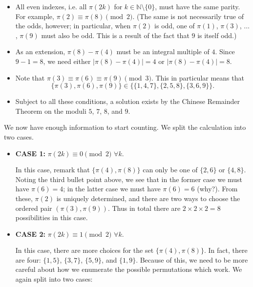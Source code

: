 \documentclass[10pt]{article}
\begin{document}
\begin{enumerate}
\begin{itemize}

\item All even indexes, i.e. all $\pi(2k)$ for $k\in\mathbb{N}\setminus\{0\}$, must have the same parity.  For example, $\pi(2)\equiv\pi(8)\pmod 2$.  (The same is not necessarily true of the odds, however; in particular, when $\pi(2)$ is odd, one of $\pi(1)$, $\pi(3)$, $\ldots$, $\pi(9)$ must also be odd.  This is a result of the fact that $9$ is itself odd.)

\item As an extension, $\pi(8)-\pi(4)$ must be an integral multiple of $4$.  Since $9-1=8$, we need either $|\pi(8)-\pi(4)|=4$ or $|\pi(8)-\pi(4)|=8.$

\item Note that $\pi(3)\equiv\pi(6)\equiv\pi(9)\pmod 3$.  This in particular means that \[\{\pi(3),\pi(6),\pi(9)\}\in\{\{1,4,7\},\{2,5,8\},\{3,6,9\}\}.\]

\item Subject to all these conditions, a solution exists by the Chinese Remainder Theorem on the moduli $5$, $7$, $8$, and $9$.

\end{itemize}

We now have enough information to start counting.  We split the calculation into two cases.

\begin{itemize}

\item\textbf{CASE 1: }$\pi(2k)\equiv 0\pmod 2$ $\forall k$.

In this case, remark that $\{\pi(4),\pi(8)\}$ can only be one of $\{2,6\}$ or $\{4,8\}$.  Noting the third bullet point above, we see that in the former case we must have $\pi(6)=4$; in the latter case we must have $\pi(6)=6$ (why?).  From these, $\pi(2)$ is uniquely determined, and there are two ways to choose the ordered pair $(\pi(3),\pi(9))$.  Thus in total there are $2\times 2\times 2=8$ possibilities in this case.

\item\textbf{CASE 2: }$\pi(2k)\equiv 1\pmod 2$ $\forall k$.

In this case, there are more choices for the set $\{\pi(4),\pi(8)\}$.  In fact, there are four: $\{1,5\}$, $\{3,7\}$, $\{5,9\}$, and $\{1,9\}$.  Because of this, we need to be more careful about how we enumerate the possible permutations which work.  We again split into two cases:


\end{itemize}
\end{enumerate}
\end{document}
